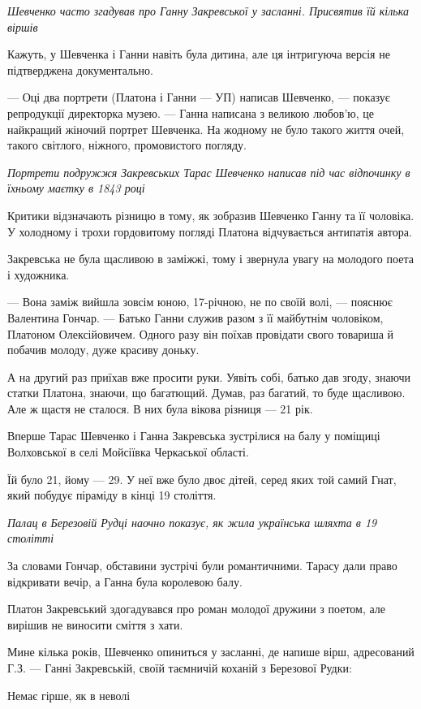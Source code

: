 \emph{Шевченко часто згадував про Ганну Закревської у засланні. Присвятив їй кілька віршів}

Кажуть, у Шевченка і Ганни навіть була дитина, але ця інтригуюча версія не
підтверджена документально.

--- Оці два портрети (Платона і Ганни --- УП) написав Шевченко, --- показує
репродукції директорка музею. --- Ганна написана з великою любов’ю, це найкращий
жіночий портрет Шевченка. На жодному не було такого життя очей, такого
світлого, ніжного, промовистого погляду. 

\emph{Портрети подружжя Закревських Тарас Шевченко написав під час відпочинку в їхньому маєтку в 1843 році}

Критики відзначають різницю в тому, як зобразив Шевченко Ганну та її чоловіка.
У холодному і трохи гордовитому погляді Платона відчувається антипатія автора.

Закревська не була щасливою в заміжжі, тому і звернула увагу на молодого поета
і художника.

--- Вона заміж вийшла зовсім юною, 17-річною, не по своїй волі, --- пояснює
Валентина Гончар. ---  Батько Ганни служив разом з її майбутнім чоловіком,
Платоном Олексійовичем. Одного разу він поїхав провідати свого товариша й
побачив молоду, дуже красиву доньку. 

А на другий раз приїхав вже просити руки. Уявіть собі, батько дав згоду, знаючи
статки Платона, знаючи, що багатющий. Думав, раз багатий, то буде щасливою. Але
ж щастя не сталося. В них була вікова різниця --- 21 рік. 

Вперше Тарас Шевченко і Ганна Закревська зустрілися на балу у поміщиці
Волховської в селі Мойсіївка Черкаської області. 

Їй було 21, йому --- 29. У неї вже було двоє дітей, серед яких той самий Гнат,
який побудує піраміду в кінці 19 століття.

\emph{Палац в Березовій Рудці наочно показує, як жила українська шляхта в 19 столітті}

За словами Гончар, обставини зустрічі були романтичними. Тарасу дали право
відкривати вечір, а Ганна була королевою балу.

Платон Закревський здогадувався про роман молодої дружини з поетом, але вирішив
не виносити сміття з хати.

Мине кілька років, Шевченко опиниться у засланні, де напише вірш, адресований
Г.З. --- Ганні Закревській, своїй таємничій коханій з Березової Рудки:

Немає гірше, як в неволі

